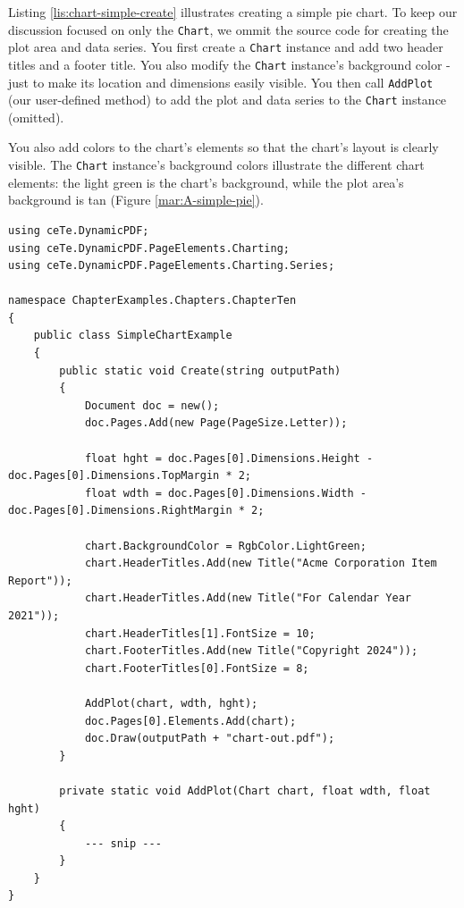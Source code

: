 \documentclass[american]{tufte-book}
\numberwithin{equation}{section}
\numberwithin{figure}{section}
\begin{document}
{\begin{marginfigure}
\end{marginfigure}

Listing \ref{lis:chart-simple-create} illustrates creating a simple
pie chart. To keep our discussion focused on only the \texttt{Chart},
we ommit the source code for creating the plot area and data series.
You first create a \texttt{Chart} instance and add two header titles
and a footer title. You also modify the \texttt{Chart} instance's
background color - just to make its location and dimensions easily
visible. You then call \texttt{AddPlot} (our user-defined method) to
add the plot and data series to the \texttt{Chart} instance (omitted). 

You also add colors to the chart's elements so that the chart's layout
is clearly visible. The \texttt{Chart} instance's background colors
illustrate the different chart elements: the light green is the chart's
background, while the plot area's background is tan (Figure \ref{mar:A-simple-pie}).

\bgroup{}
\begin{lstlisting}[caption={Creating a simple chart.},label={lis:chart-simple-create},basicstyle={\footnotesize\ttfamily},breaklines=true]
using ceTe.DynamicPDF;
using ceTe.DynamicPDF.PageElements.Charting;
using ceTe.DynamicPDF.PageElements.Charting.Series;

namespace ChapterExamples.Chapters.ChapterTen
{
    public class SimpleChartExample
    {
        public static void Create(string outputPath)
        {
            Document doc = new();
            doc.Pages.Add(new Page(PageSize.Letter));

            float hght = doc.Pages[0].Dimensions.Height - doc.Pages[0].Dimensions.TopMargin * 2;
            float wdth = doc.Pages[0].Dimensions.Width - doc.Pages[0].Dimensions.RightMargin * 2;
 
            chart.BackgroundColor = RgbColor.LightGreen;
            chart.HeaderTitles.Add(new Title("Acme Corporation Item Report"));
            chart.HeaderTitles.Add(new Title("For Calendar Year 2021"));
            chart.HeaderTitles[1].FontSize = 10;
            chart.FooterTitles.Add(new Title("Copyright 2024"));
            chart.FooterTitles[0].FontSize = 8;

            AddPlot(chart, wdth, hght);
            doc.Pages[0].Elements.Add(chart);
            doc.Draw(outputPath + "chart-out.pdf");
        }

        private static void AddPlot(Chart chart, float wdth, float hght)
        {
            --- snip ---
        }
    }
}
\end{lstlisting}
\leavevmode\egroup

}
\end{document}
